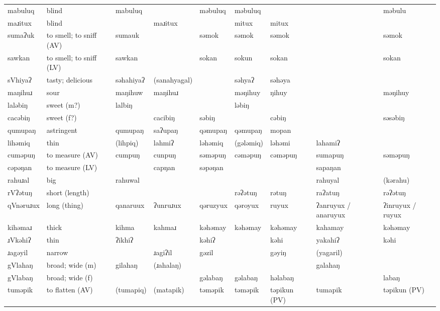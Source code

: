 \begin{landscape}
\begin{longtable}{*{9}{p{}}}
\text{*}mabuluq & blind & mabuluq &  & məbuluq & məbuluq &  &  & məbulu\\
\text{*}maɹitux & blind &  & maɹitux &  & mitux & mitux &  & \\
\text{*}sumaʔuk & to smell; to sniff (AV) & sumauk &  & səmok & səmok & səmok &  & səmok\\
\text{*}sawkan & to smell; to sniff (LV) & sawkan &  & sokan & sokun & sokan &  & sokan\\
\text{*}sVhiyaʔ & tasty; delicious & səhahiyaʔ & (sanahyagal) &  & səhyaʔ & səhəya &  & \\
\text{*}maŋihuɹ & sour & maŋihuw & maŋihuɹ &  & məŋihuy & ŋihuy &  & məŋihuy\\
\text{*}laləbiŋ & sweet (m?) & lalbiŋ &  &  & ləbiŋ &  &  & \\
\text{*}cacəbiŋ & sweet (f?) &  & cacibiŋ & səbiŋ &  & cəbiŋ &  & səsəbiŋ\\
\text{*}qumupaŋ & astringent & qumupaŋ & saʔupaŋ & qəmupaŋ & qəmupaŋ & mopan &  & \\
\text{*}lihəmiq & thin & (lihpiq) & lahmiʔ & ləhəmiq & (gələmiq) & ləhəmi & lahamiʔ & \\
\text{*}cuməpuŋ & to measure (AV) & cumpuŋ & cunpuŋ & səməpuŋ & cəməpuŋ & cəməpuŋ & sumapuŋ & səməpuŋ\\
\text{*}cəpəŋan & to measure (LV) &  & capŋan & səpəŋan &  &  & sapaŋan & \\
\text{*}rahuɹal & big & rahuwal &  &  &  &  & rahuyal & (kərahu)\\
\text{*}rVʔətuŋ & short (length) &  &  &  & rəʔətuŋ & rətuŋ & raʔatuŋ & rəʔətuŋ\\
\text{*}qVnəruɹux & long (thing) & qanaruux & ʔunruɹux & qəruzyux & qəroyux & ruyux & ʔanruyux / anaruyux & ʔinruyux / ruyux\\
\text{*}kihəmaɹ & thick & kihma & kahmaɹ & kəhəmay & kəhəmay & kəhəmay & kahamay & kəhəmay\\
\text{*}ɹVkəhiʔ & thin & ʔikhiʔ &  & kəhiʔ &  & kəhi & yakahiʔ & kəhi\\
\text{*}ɹagəyil & narrow &  & ɹagiʔil & gəzil &  & gəyiŋ & (yagaril) & \\
\text{*}gVlahaŋ & broad; wide (m) & gilahaŋ & (ɹahalaŋ) &  &  &  & galahaŋ & \\
\text{*}gVlabaŋ & broad; wide (f) &  &  & gəlabaŋ & gəlabaŋ & həlabaŋ &  & labaŋ\\
\text{*}tuməpik & to flatten (AV) & (tumapiq) & (matapik) & təməpik & təməpik & təpikun (PV) & tumapik & təpikun (PV)\\

\end{longtable}
\end{landscape}
